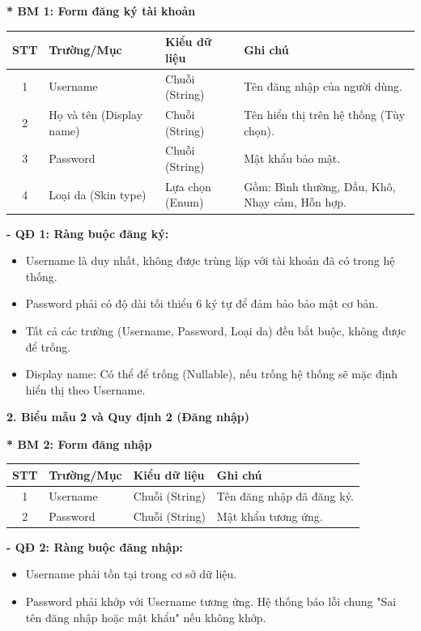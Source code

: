 \documentclass[12pt,a4paper]{article}
\begin{document}
\textbf{* BM 1: Form đăng ký tài khoản}
\begin{center}
\begin{tabular}{|c|p{3.5cm}|p{3.5cm}|p{5cm}|}
\hline
\textbf{STT} & \textbf{Trường/Mục} & \textbf{Kiểu dữ liệu} & \textbf{Ghi chú} \\
\hline
1 & Username & Chuỗi (String) & Tên đăng nhập của người dùng. \\
\hline

2 & Họ và tên (Display name) & Chuỗi (String) & Tên hiển thị trên hệ thống (Tùy chọn). \\
\hline

3 & Password & Chuỗi (String) & Mật khẩu bảo mật. \\
\hline
4 & Loại da (Skin type) & Lựa chọn (Enum) & Gồm: Bình thường, Dầu, Khô, Nhạy cảm, Hỗn hợp. \\
\hline
\end{tabular}
\end{center}

\textbf{- QĐ 1: Ràng buộc đăng ký:}
\begin{itemize}
    \item Username là duy nhất, không được trùng lặp với tài khoản đã có trong hệ thống.
    \item Password phải có độ dài tối thiểu 6 ký tự để đảm bảo bảo mật cơ bản.
    \item Tất cả các trường (Username, Password, Loại da) đều bắt buộc, không được để trống.
    \item Display name: Có thể để trống (Nullable), nếu trống hệ thống sẽ mặc định hiển thị theo Username.
\end{itemize}

\vspace{0.5cm}
\textbf{2. Biểu mẫu 2 và Quy định 2 (Đăng nhập)}

\textbf{* BM 2: Form đăng nhập}
\begin{center}
\begin{tabular}{|c|p{3.5cm}|p{3.5cm}|p{5cm}|}
\hline
\textbf{STT} & \textbf{Trường/Mục} & \textbf{Kiểu dữ liệu} & \textbf{Ghi chú} \\
\hline
1 & Username & Chuỗi (String) & Tên đăng nhập đã đăng ký. \\
\hline
2 & Password & Chuỗi (String) & Mật khẩu tương ứng. \\
\hline
\end{tabular}
\end{center}

\textbf{- QĐ 2: Ràng buộc đăng nhập:}
\begin{itemize}
    \item Username phải tồn tại trong cơ sở dữ liệu.
    \item Password phải khớp với Username tương ứng. Hệ thống báo lỗi chung "Sai tên đăng nhập hoặc mật khẩu" nếu không khớp.
\end{itemize}
\end{document}

